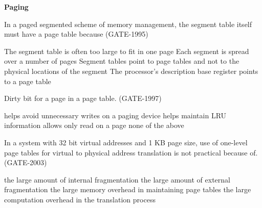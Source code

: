 
\centerline{\textbf{ \LARGE Paging}}


\begin{questyle}

  \question  In a paged segmented scheme of memory management, the segment table itself must have
             a page table because (GATE-1995)

  \begin{choices}
    \correctchoice The segment table is often too large to fit in one page
    \choice Each segment is spread over a number of pages
    \choice Segment tables point to page tables and not to the physical locations of the segment
    \choice The processor’s description base register points to a page table
  \end{choices}
\end{questyle}


\begin{questyle}

  \question Dirty bit for a page in a page table. (GATE-1997)

  \begin{choices}
    \correctchoice helps avoid unnecessary writes on a paging device
    \choice helps maintain LRU information
    \choice allows only read on a page
    \choice none of the above
  \end{choices}
\end{questyle}



\begin{questyle}

  \question In a system with 32 bit virtual addresses and 1 KB page size, use of one-level page tables for virtual to
            physical address translation is not practical because of. (GATE-2003)

  \begin{choices}
    \choice the large amount of internal fragmentation
    \choice the large amount of external fragmentation
    \correctchoice the large memory overhead in maintaining page tables
    \choice  the large computation overhead in the translation process
  \end{choices}

\end{questyle}

